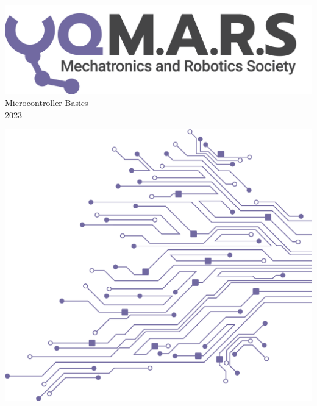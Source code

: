 \documentclass[a4paper,12pt]{report}
\begin{document}
\begin{titlepage}
    \begin{center}
        \vspace*{15mm}
        \includegraphics[width=0.4\paperwidth]{Assets/Logo (Dark).png} \\
        \vspace{1cm}
        \Huge Microcontroller Basics \\
        \huge \textcolor{turbo_purple}{2023}
    \end{center}
    \vfill
    \includegraphics[height=0.5\paperheight, right]{Assets/Pattern - PCB (Solid).png}
    \vspace*{10mm}
\end{titlepage}
\restoregeometry
\end{document}

